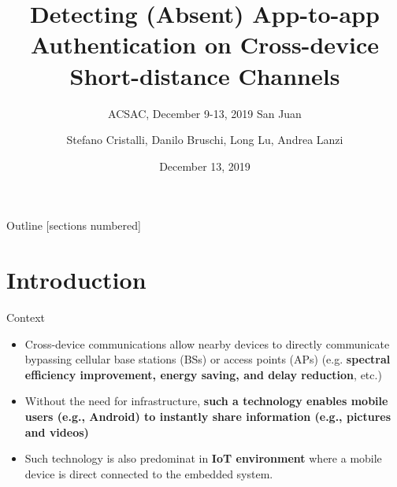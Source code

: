 \documentclass[10pt]{beamer}
\title{Detecting (Absent) App-to-app Authentication on Cross-device
  Short-distance Channels}
\subtitle{ACSAC, December 9-13, 2019 San Juan}
\date{December 13, 2019}
\author{Stefano Cristalli, Danilo Bruschi, Long Lu, Andrea Lanzi}
\institute{University of Milan Italy, Northeastern University Boston US}
\begin{document}
\maketitle 

\begin{frame}{Outline}
  [sections numbered]
  \tableofcontents[hideallsubsections]
\end{frame}

\section{Introduction}
\begin{frame}[fragile]{Context}
  \begin{itemize}

  \item Cross-device communications allow nearby devices to directly
    communicate bypassing cellular base stations (BSs) or access
    points (APs) (e.g. {\bf spectral efficiency improvement, energy
      saving, and delay reduction}, etc.)

  \item Without the need for infrastructure, {\bf such a technology
      enables mobile users (e.g., Android) to instantly share
      information (e.g., pictures and videos)}

  \item Such technology is also predominat in {\bf IoT environment}
    where a mobile device is direct connected to the embedded system.

  \end{itemize}

 \end{frame}
\end{document}
